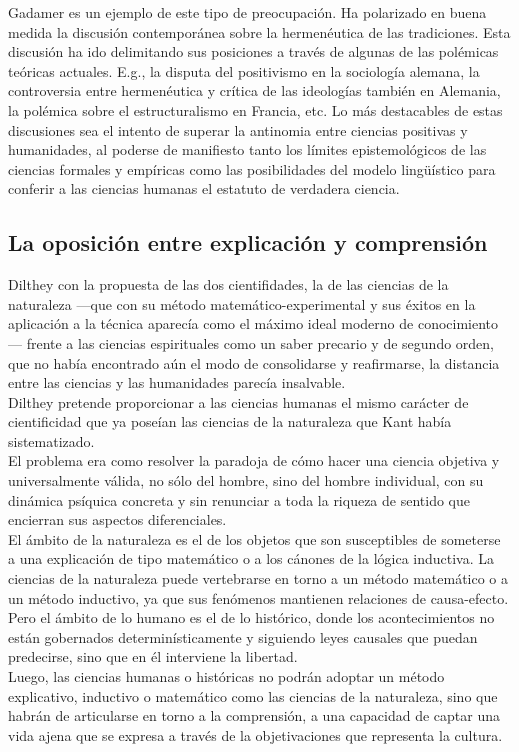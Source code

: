 \documentclass[a4paper, 11pt, twocolumn, spanish]{article}
\begin{document}
Gadamer es un ejemplo de este tipo de preocupación. Ha polarizado en
buena medida la discusión contemporánea sobre la hermenéutica de las
tradiciones. Esta discusión ha ido delimitando sus posiciones a través
de algunas de las polémicas teóricas actuales. E.g., la disputa del
positivismo en la sociología alemana, la controversia entre
hermenéutica y crítica de las ideologías también en Alemania, la
polémica sobre el estructuralismo en Francia, etc. Lo más destacables
de estas discusiones sea el intento de superar la antinomia entre
ciencias positivas y humanidades, al poderse de manifiesto tanto los
límites epistemológicos de las ciencias formales y empíricas como las
posibilidades del modelo lingüístico para conferir a las ciencias
humanas el estatuto de verdadera ciencia.

\subsection{La oposición entre explicación y comprensión}
\label{sec:org5c9ff79}
Dilthey con la propuesta de las dos cientifidades, la de las ciencias
de la naturaleza —que con su método matemático-experimental y sus
éxitos en la aplicación a la técnica aparecía como el máximo ideal
moderno de conocimiento— frente a las ciencias espirituales como un
saber precario y de segundo orden, que no había encontrado aún el modo
de consolidarse y reafirmarse, la distancia entre las ciencias y las
humanidades parecía insalvable.\\[0pt]
Dilthey pretende proporcionar a las ciencias humanas el mismo carácter
de cientificidad que ya poseían las ciencias de la naturaleza que Kant
había sistematizado.\\[0pt]
El problema era como resolver la paradoja de cómo hacer una ciencia
objetiva y universalmente válida, no sólo del hombre, sino del hombre
individual, con su dinámica psíquica concreta y sin renunciar a toda
la riqueza de sentido que encierran sus aspectos diferenciales.\\[0pt]

El ámbito de la naturaleza es el de los objetos que son susceptibles de
someterse a una explicación de tipo matemático o a los cánones de la
lógica inductiva. La ciencias de la naturaleza puede vertebrarse en
torno a un método matemático o a un método inductivo, ya que sus
fenómenos mantienen relaciones de causa-efecto.\\[0pt]
Pero el ámbito de lo humano es el de lo histórico, donde los
acontecimientos no están gobernados determinísticamente y siguiendo
leyes causales que puedan predecirse, sino que en él interviene la
libertad.\\[0pt]
Luego, las ciencias humanas o históricas no podrán adoptar un método
explicativo, inductivo o matemático como las ciencias de la
naturaleza, sino que habrán de articularse en torno a la comprensión,
a una capacidad de captar una vida ajena que se expresa a través de la
objetivaciones que representa la cultura.\\[0pt]
\end{document}

